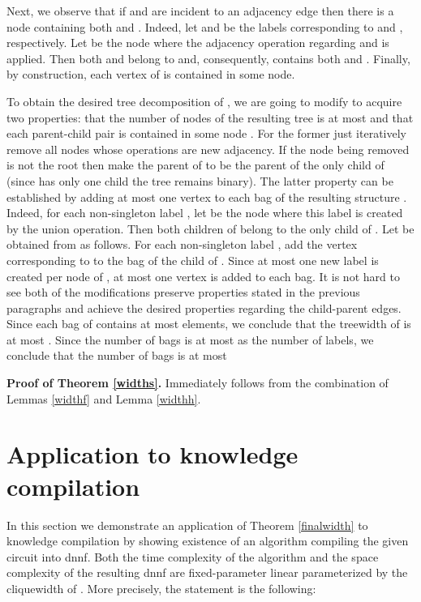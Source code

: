 \documentclass{llncs}
\begin{document}
Next, we observe that if  and  are incident to an adjacency edge then
there is a node  containing both  and . Indeed, let  and 
be the labels corresponding to  and , respectively. Let  be the node
where the adjacency operation regarding  and  is applied. Then both 
and  belong to  and, consequently,  contains both  and .
Finally, by construction, each vertex of  is contained in some node.


To obtain the desired tree decomposition of , we are going to modify 
to acquire two properties: that the number of nodes of the resulting tree is at most 
and that each parent-child pair  is contained in some node . 
For the former just iteratively remove all nodes whose operations are new adjacency.
If the node  being removed is not the root then make the parent of  to be the parent
of the only child of  (since  has only one child the tree remains binary).
The latter property can be
established by adding at most one vertex to each bag of the resulting structure . Indeed,
for each non-singleton label , let  be the node where this label is created by the union 
operation. Then both children of  belong to the only child of .
Let  be obtained from  as follows. For each non-singleton label
, add the vertex corresponding to  to the bag of the child of . Since at most one new label
is created per node of , at most one vertex is added to each bag. It is not hard to see 
both of the modifications preserve
properties stated in the previous paragraphs and achieve the desired properties regarding the child-parent edges.
Since each bag of  contains at most  elements, we conclude that the treewidth of 
is at most . Since the number of bags is at most as the number of labels, we conclude that the number of bags
is at most  

{\bf Proof of Theorem \ref{widths}.}
Immediately follows from the combination of
Lemmas \ref{widthf} and Lemma \ref{widthh}. 
 



\section{Application to knowledge compilation}
In this section we demonstrate an application of Theorem \ref{finalwidth} to knowledge compilation
by showing existence of an algorithm compiling the given circuit  into {\sc dnnf}. Both the time
complexity of the algorithm and the space complexity of the resulting {\sc dnnf} are fixed-parameter linear
parameterized by the cliquewidth of . More precisely, the statement is the following:
\end{document}
